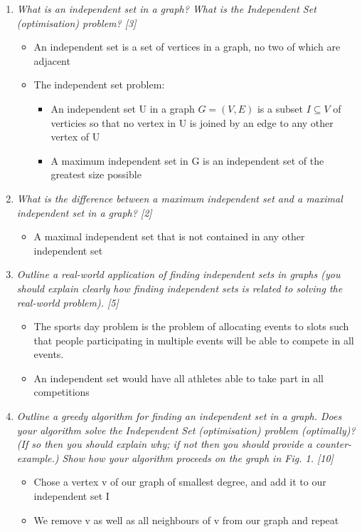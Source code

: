 \documentclass{article}[18pt]
\begin{document}
\begin{enumerate}
	
	
	\item \textit{What is an independent set in a graph? What is the Independent Set
		(optimisation) problem? [3]}
\begin{itemize}
	\item An independent set is a set of vertices in a graph, no two of which are adjacent
	\item The independent set problem:
	\begin{itemize}
		\item An independent set U in a graph $G=(V,E)$ is a subset $I\subseteq V$ of verticies so that no vertex in U is joined by an edge to any other vertex of U
		\item A maximum independent set in G is an independent set of the greatest size possible
	\end{itemize}
\end{itemize}	
	
	
	\item \textit{What is the difference between a maximum independent set and a
		maximal independent set in a graph? [2]}
	\begin{itemize}
		\item A maximal independent set that is not contained in any other independent set
	\end{itemize}	
	
	\item \textit{Outline a real-world application of finding independent sets in graphs
		(you should explain clearly how finding independent sets is related to
		solving the real-world problem). [5]}
\begin{itemize}
	\item The sports day problem is the problem of allocating events to slots such that people participating in multiple events will be able to compete in all events.
	\item An independent set would have all athletes able to take part in all competitions
\end{itemize}	
	
	
	
	
	\item \textit{Outline a greedy algorithm for finding an independent set in a graph.
		Does your algorithm solve the Independent Set (optimisation) problem
		(optimally)? (If so then you should explain why; if not then you should
		provide a counter-example.) Show how your algorithm proceeds on the
		graph in Fig. 1. [10]}
	\begin{itemize}
		\item Chose a vertex v of our graph of smallest degree, and add it to our independent set I
		\item We remove v as well as all neighbours of v from our graph and repeat
	\end{itemize}
	

\end{enumerate}
\end{document}
